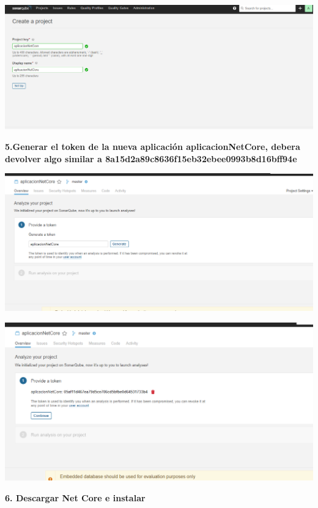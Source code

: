 \documentclass[12pt,letterpaper]{article}
\begin{document}
	 \begin{center}
		\includegraphics[width=15cm]{./Imagenes/5} 
	\end{center}


\textbf{5.Generar el token de la nueva aplicación aplicacionNetCore, debera devolver algo similar a 8a15d2a89c8636f15eb32ebee0993b8d16bff94e}

    \begin{center}
		\includegraphics[width=15cm]{./Imagenes/6} 
	\end{center}
	
	 \begin{center}
		\includegraphics[width=15cm]{./Imagenes/7} 
	\end{center}


\textbf{6. Descargar Net Core e instalar}
\end{document}
